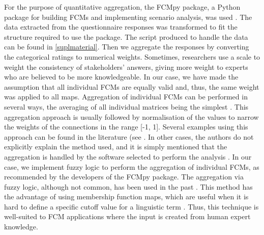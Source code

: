 For the purpose of quantitative aggregation, the FCMpy package, a Python package for building FCMs and implementing scenario analysis, was used \citep{mkhitaryan2022fcmpy}. The data extracted from the questionnaire responses was transformed to fit the structure required to use the package. The script produced to handle the data can be found in \cref{suplmaterial}. Then we aggregate the responses by converting the categorical ratings to numerical weights. Sometimes, researchers use a scale to weight the consistency of stakeholders' answers, giving more weight to experts who are believed to be more knowledgeable. In our case, we have made the assumption that all individual FCMs are equally valid and, thus, the same weight was applied to all maps. Aggregation of individual FCMs can be performed in several ways, the averaging of all individual matrices being the simplest \citep{jetter2014fuzzy}. This aggregation approach is usually followed by normalisation of the values to narrow the weights of the connections in the range [-1, 1]. Several examples using this approach can be found in the literature (see \citep{lopolito2020combined, morone2021using, morone2019promote}. In other cases, the authors do not explicitly explain the method used, and it is simply mentioned that the aggregation is handled by the software selected to perform the analysis \cite{konti2022determinants, kokkinos2020circular, falcone2020use}. In our case, we implement fuzzy logic to perform the aggregation of individual FCMs, as recommended by the developers of the FCMpy package. The aggregation via fuzzy logic, although not common, has been used in the past \citep{nasirzadeh2020modelling, amini2022combined}. This method has the advantage of using membership function maps, which are useful when it is hard to define a specific cutoff value for a linguistic term \citep{wang2015study}. Thus, this technique is well-suited to FCM applications where the input is created from human expert knowledge. 

